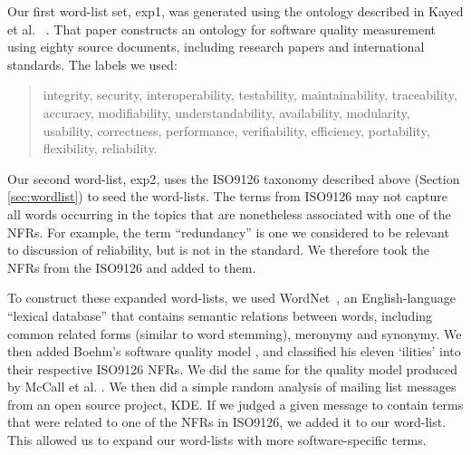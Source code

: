 \documentclass[]{sig-alternate}
\begin{document}
Our first word-list set, \textsf{exp1}, was generated using the ontology described in Kayed et al.~\cite{5072519} .
That paper constructs an ontology for software quality measurement using eighty source documents, including research papers and international standards. 
The labels we used:
\begin{quotation}
\small \noindent \textsf{
integrity, security,
interoperability, testability, maintainability, traceability,
accuracy, modifiability, understandability, availability, modularity,
usability, correctness, performance, verifiability, efficiency,
portability, flexibility, reliability.
}
\end{quotation}

Our second word-list, \textsf{exp2}, uses the ISO9126 taxonomy described above (Section \ref{sec:wordlist}) to seed the word-lists.
The terms from ISO9126 may not capture all words occurring in the topics that are nonetheless associated with one of the NFRs. 
For example, the term ``redundancy'' is one 
we considered to be
relevant to discussion of reliability, but is not in the standard. 
We therefore took the NFRs from the ISO9126 and added to them.

To construct these expanded word-lists, we used WordNet~\cite{Fellbaum1998}, an English-language ``lexical database'' that contains semantic relations between words, including common related forms (similar to word stemming), meronymy and synonymy. 
We then added Boehm's software quality model \cite{Boehm+:1976:ICSE}, and classified his eleven `ilities' into their respective ISO9126 NFRs. 
We did the same for the quality model produced by McCall et al. \cite{mccall1977}. 
We then did a simple random analysis of mailing list messages from an open source project, KDE. If we judged a given message to contain terms that were related to one of the NFRs in ISO9126, we added it to our word-list. This allowed us to expand our word-lists with more software-specific terms.
\end{document}
